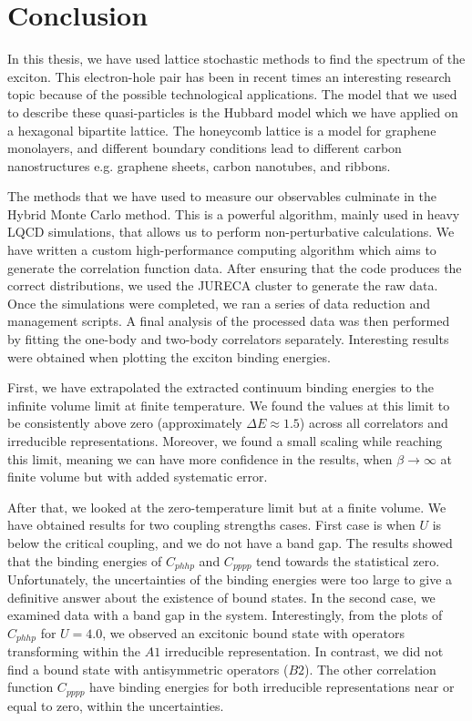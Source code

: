 
\chapter{Conclusion}
\label{sec:conclusion}

In this thesis, we have used lattice stochastic methods to find the spectrum of the exciton. This electron-hole pair has been in recent times an interesting research topic because of the possible technological applications. The model that we used to describe these quasi-particles is the Hubbard model which we have applied on a hexagonal bipartite lattice. The honeycomb lattice is a model for graphene monolayers, and different boundary conditions lead to different carbon nanostructures e.g. graphene sheets, carbon nanotubes, and ribbons.

The methods that we have used to measure our observables culminate in the Hybrid Monte Carlo method. This is a powerful algorithm, mainly used in heavy LQCD simulations, that allows us to perform non-perturbative calculations. We have written a custom high-performance computing algorithm which aims to generate the correlation function data. After ensuring that the code produces the correct distributions, we used the JURECA cluster to generate the raw data. Once the simulations were completed, we ran a series of data reduction and management scripts. A final analysis of the processed data was then performed by fitting the one-body and two-body correlators separately. Interesting results were obtained when plotting the exciton binding energies.

First, we have extrapolated the extracted continuum binding energies to the infinite volume limit at finite temperature. We found the values at this limit to be consistently above zero (approximately $\Delta E \approx 1.5$) across all correlators and irreducible representations. Moreover, we found a small scaling while reaching this limit, meaning we can have more confidence in the results, when $\beta \to \infty$ at finite volume but with added systematic error. 

After that, we looked at the zero-temperature limit but at a finite volume. We have obtained results for two coupling strengths cases. First case is when $U$ is below the critical coupling, and we do not have a band gap. The results showed that the binding energies of $C_{phhp}$ and $C_{pppp}$ tend towards the statistical zero. Unfortunately, the uncertainties of the binding energies were too large to give a definitive answer about the existence of bound states. In the second case, we examined data with a band gap in the system. Interestingly, from the plots of $C_{phhp}$ for $U=4.0$, we observed an excitonic bound state with operators transforming within the $A1$ irreducible representation. In contrast, we did not find a bound state with antisymmetric operators ($B2$). The other correlation function $C_{pppp}$ have binding energies for both irreducible representations near or equal to zero, within the uncertainties. 

